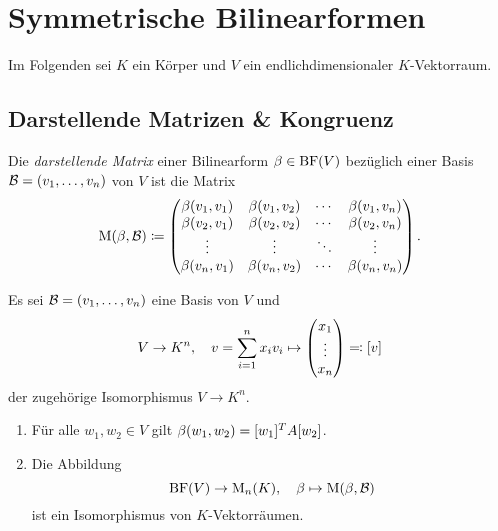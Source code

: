 \chapter{Symmetrische Bilinearformen}

Im Folgenden sei $K$ ein Körper und $V$ ein endlichdimensionaler $K$-Vektorraum.





\section{Darstellende Matrizen \& Kongruenz}

\begin{definition}
  \label{definition: representing matrix for a bilinear form}
  Die \emph{darstellende Matrix} einer Bilinearform $\beta \in \operatorname{BF}(V)$ bezüglich einer Basis $\mathcal{B} = (v_1, \dotsc, v_n)$ von $V$ ist die Matrix
  \[
              \operatorname{M}(\beta, \mathcal{B})
    \coloneqq \begin{pmatrix}
                \beta(v_1, v_1) & \beta(v_1, v_2) & \cdots  & \beta(v_1, v_n) \\
                \beta(v_2, v_1) & \beta(v_2, v_2) & \cdots  & \beta(v_2, v_n) \\
                \vdots          & \vdots          & \ddots  & \vdots          \\
                \beta(v_n, v_1) & \beta(v_n, v_2) & \cdots  & \beta(v_n, v_n)
              \end{pmatrix}.
  \]
\end{definition}

\begin{proposition}
  Es sei $\mathcal{B} = (v_1, \dotsc, v_n)$ eine Basis von $V$ und
  \[
              V
    \to       K^n,
    \quad     v
    =         \sum_{i=1}^n x_i v_i
    \mapsto   \begin{pmatrix} x_1 \\ \vdots \\ x_n \end{pmatrix}
    \eqqcolon [v]
  \]
  der zugehörige Isomorphismus $V \to K^n$.
  \begin{enumerate}
    \item
      Für alle $w_1, w_2 \in V$ gilt $\beta(w_1, w_2) = [w_1]^T A [w_2]$.
    \item
      Die Abbildung
      \[
                \operatorname{BF}(V)
        \to     \operatorname{M}_{n}(K),
        \quad   \beta
        \mapsto \operatorname{M}(\beta, \mathcal{B})     
      \]
      ist ein Isomorphismus von $K$-Vektorräumen.
  \end{enumerate}
\end{proposition}

